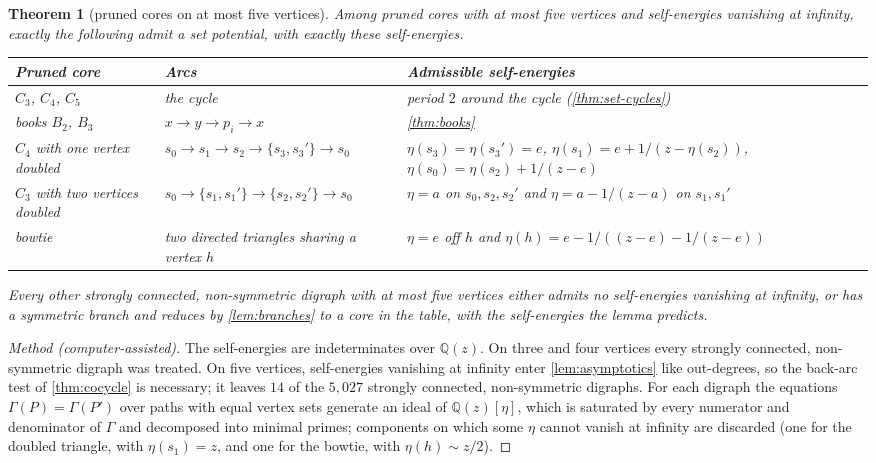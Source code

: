 \documentclass[11pt]{amsart}
\theoremstyle{plain}
\newtheorem{theorem}{Theorem}[section]
\theoremstyle{definition}
\theoremstyle{remark}
\numberwithin{equation}{section}
\newcommand{\QQ}{\mathbb{Q}}
\newcommand{\Qz}{\QQ(z)}
\begin{document}
\begin{theorem}[pruned cores on at most five vertices]\label{thm:cores5}
Among pruned cores with at most five vertices and self-energies vanishing at infinity, exactly the following admit a set potential, with exactly these self-energies.
\begin{center}\small
\begin{tabularx}{\linewidth}{@{}L{0.2}L{0.3}>{\raggedright\arraybackslash}X@{}}
\toprule
Pruned core & Arcs & Admissible self-energies\\ \midrule
$C_3$, $C_4$, $C_5$ & the cycle & period $2$ around the cycle (\cref{thm:set-cycles})\\
books $B_2$, $B_3$ & $x\to y\to p_i\to x$ & \cref{thm:books}\\
$C_4$ with one vertex doubled & $s_0\to s_1\to s_2\to\{s_3,s_3'\}\to s_0$ & $\eta(s_3)=\eta(s_3')=e$, $\eta(s_1)=e+1/(z-\eta(s_2))$, $\eta(s_0)=\eta(s_2)+1/(z-e)$\\
$C_3$ with two vertices doubled & $s_0\to\{s_1,s_1'\}\to\{s_2,s_2'\}\to s_0$ & $\eta=a$ on $s_0,s_2,s_2'$ and $\eta=a-1/(z-a)$ on $s_1,s_1'$\\
bowtie & two directed triangles sharing a vertex $h$ & $\eta=e$ off $h$ and $\eta(h)=e-1/((z-e)-1/(z-e))$\\
\bottomrule
\end{tabularx}
\end{center}
Every other strongly connected, non-symmetric digraph with at most five vertices either admits no self-energies vanishing at infinity, or has a symmetric branch and reduces by \cref{lem:branches} to a core in the table, with the self-energies the lemma predicts.
\end{theorem}
\begin{proof}[Method \textup{(computer-assisted)}]
The self-energies are indeterminates over $\Qz$. On three and four vertices every strongly connected, non-symmetric digraph was treated. On five vertices, self-energies vanishing at infinity enter \cref{lem:asymptotics} like out-degrees, so the back-arc test of \cref{thm:cocycle} is necessary; it leaves $14$ of the $5{,}027$ strongly connected, non-symmetric digraphs. For each digraph the equations $\Gamma(P)=\Gamma(P')$ over paths with equal vertex sets generate an ideal of $\Qz[\eta]$, which is saturated by every numerator and denominator of $\Gamma$ and decomposed into minimal primes; components on which some $\eta$ cannot vanish at infinity are discarded (one for the doubled triangle, with $\eta(s_1)=z$, and one for the bowtie, with $\eta(h)\sim z/2$).
\end{proof}
\end{document}
